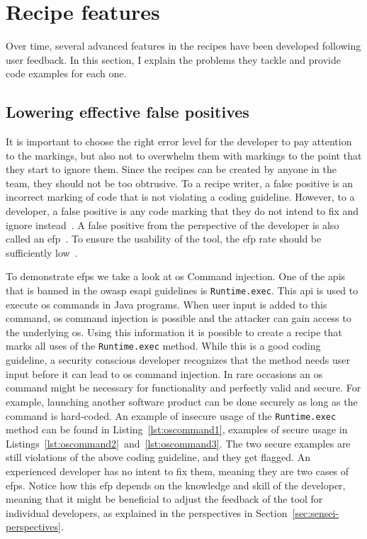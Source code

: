 \section{Recipe features}
\label{sec:features}

Over time, several advanced features in the recipes have been developed following user feedback.
In this section, I explain the problems they tackle and provide code examples for each one.

\subsection{Lowering effective false positives}
\label{sec:efp}
It is important to choose the right error level for the developer to pay attention to the markings, but also not to overwhelm them with markings to the point that they start to ignore them.
Since the recipes can be created by anyone in the team, they should not be too obtrusive.
To a recipe writer, a false positive is an incorrect marking of code that is not violating a coding guideline.
However, to a developer, a false positive is any code marking that they do not intend to fix and ignore instead~\cite{ayewah2007evaluating}.
A false positive from the perspective of the developer is also called an \gls{efp}~\cite{sadowski2015tricorder}.
To ensure the usability of the tool, the \gls{efp} rate should be sufficiently low~\cite{sadowski2015tricorder,johnson2013don}.

To demonstrate \glspl{efp} we take a look at \gls{os} Command injection.
One of the \glspl{api} that is banned in the \gls{owasp} \gls{esapi} guidelines is \texttt{Runtime.exec}.
This \gls{api} is used to execute \gls{os} commands in Java programs.
When user input is added to this command, \gls{os} command injection is possible and the attacker can gain access to the underlying \gls{os}.
Using this information it is possible to create a recipe that marks all uses of the \texttt{Runtime.exec} method.
While this is a good coding guideline, a security conscious developer recognizes that the method needs user input before it can lead to \gls{os} command injection.
In rare occasions an \gls{os} command might be necessary for functionality and perfectly valid and secure.
For example, launching another software product can be done securely as long as the command is hard-coded.
An example of insecure usage of the \texttt{Runtime.exec} method can be found in Listing~\ref{lst:oscommand1}, examples of secure usage in Listings~\ref{lst:oscommand2}~and~\ref{lst:oscommand3}.
The two secure examples are still violations of the above coding guideline, and they get flagged.
An experienced developer has no intent to fix them, meaning they are two cases of \glspl{efp}.
Notice how this \gls{efp} depends on the knowledge and skill of the developer, meaning that it might be beneficial to adjust the feedback of the tool for individual developers, as explained in the perspectives in Section~\ref{sec:sensei-perspectives}.

